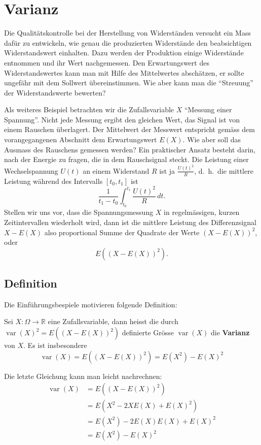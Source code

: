 \section{Varianz}\label{section-varianz}
Die Qualitätskontrolle bei der Herstellung von Widerständen versucht
ein Mass dafür zu entwickeln, wie genau die produzierten Widerstände
den beabsichtigen Widerstandswert einhalten. 
Dazu werden der Produktion einige Widerstände entnommen und ihr Wert
nachgemessen.
Den Erwartungswert des Widerstandswertes kann man mit
Hilfe des Mittelwertes abschätzen, er sollte ungefähr mit dem Sollwert
übereinstimmen.
Wie aber kann man die ``Streuung'' der Widerstandswerte
bewerten?

Als weiteres Beispiel betrachten wir die Zufallsvariable $X$
``Messung einer Spannung''.
Nicht jede Messung ergibt den gleichen Wert,
das Signal ist von einem Rauschen überlagert.
Der Mittelwert der
Messwert entspricht gemäss dem vorangegangenen Abschnitt dem Erwartungswert
$E(X)$.
Wie aber soll das Ausmass des Rauschens gemessen werden?
Ein praktischer Ansatz besteht darin, nach der Energie zu fragen, die
in dem Rauschsignal steckt.
Die Leistung einer Wechselspannung $U(t)$
an einem Widerstand $R$ ist ja
$\frac{U(t)^2}R$, d.~h.~die mittlere Leistung während des Intervalls $[t_0,t_1]$ 
ist
\[
\frac1{t_1-t_0}\int_{t_0}^{t_1}\frac{U(t)^2}R\,dt.
\]
Stellen wir uns vor, dass die Spannungsmessung $X$ in regelmässigen, kurzen
Zeitintervallen wiederholt wird, dann ist die mittlere Leistung
des Differenzsignal $X-E(X)$ also proportional Summe der Quadrate
der Werte $(X-E(X))^2$, oder
\[
E((X-E(X))^2).
\]

\subsection{Definition}
Die Einführungsbespiele motivieren folgende Definition:
\begin{definition}
Sei $X\colon\Omega\to\mathbb{R}$ eine Zufallsvariable, dann
heisst die durch $\operatorname{var}(X)^2=E((X-E(X))^2)$ definierte Grösse $\operatorname{var}(X)$ die
{\bf Varianz} von $X$.
Es ist insbesondere
\[
\operatorname{var}(X)=E((X-E(X))^2)=E(X^2)-E(X)^2
\]
\end{definition}
Die letzte Gleichung kann man leicht nachrechnen:
\begin{align*}
\operatorname{var}(X)&=E((X-E(X))^2)\\
&=E(X^2-2XE(X)+E(X)^2)\\
&=E(X^2)-2E(X)E(X)+E(X)^2\\
&=E(X^2)-E(X)^2
\end{align*}

